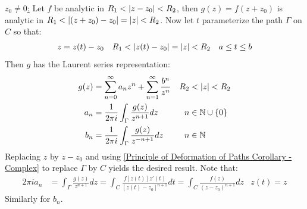 \documentclass[12pt, english]{book}
\makeatletter
\renewenvironment{proof}[1][\proofname]{\par
	\pushQED{\qed}%
	\normalfont \topsep6\p@\@plus6\p@\relax
	\list{}{%
		\settowidth{\leftmargin}{\itshape\proofname:\hskip\labelsep}%
		\setlength{\labelwidth}{0pt}%
		\setlength{\itemindent}{-\leftmargin}%
	}%
	\item[\hskip\labelsep\itshape#1\@addpunct{:}]\ignorespaces
	}{ \popQED\endlist\@endpefalse}
\makeatother
\begin{document}
\begin{proof}
		\underline{\(z_0 \neq 0\):} \newline
		Let \(f\) be analytic in \(R_1 < \abs{z-z_0} < R_2\), then \(g(z) = f(z + z_0)\) is analytic in \(R_1 < \abs{(z+z_0) - z_0} = \abs{z} < R_2\). Now let \(t\) parameterize the path \(\Gamma\) on \(C\) so that:
		\begin{align*}
			z &= z(t) - z_0 & R_1 &< \abs{z(t) - z_0} = \abs{z} < R_2 & a \leq t \leq b
		\end{align*}
		Then \(g\) has the Laurent series representation:
		\begin{align*}
			g(z) &= \sum_{n=0}^{\infty} a_n z^n + \sum_{n=1}^{\infty} \frac{b^n}{z^n} &
				R_2 &< \abs{z} < R_2 \\
			a_n &= \frac{1}{2\pi i} \int_\Gamma \frac{g(z)}{z^{n+1}} dz & n &\in \mathbb{N} \cup \{0\} \\
			b_n &= \frac{1}{2\pi i} \int_\Gamma \frac{g(z)}{z^{-n+1}} dz & n &\in \mathbb{N}
		\end{align*}
		Replacing \(z\) by \(z - z_0\) and using \cref{Principle of Deformation of Paths Corollary - Complex} to replace \(\Gamma\) by \(C\) yields the desired result. Note that: 
		\begin{align*}
			2\pi i a_n 
			&= \int_\Gamma \frac{g(z)}{z^{n+1}} dz 
			 = \int_{C} \frac{f[z(t)]z'(t)}{[z(t) - z_0]^{n+1}} dt = \int_{C} \frac{f(z)}{(z-z_0)^{n+1}} dz & z(t) = z
		\end{align*}
		Similarly for \(b_n\).
	\end{proof}
\end{document}
